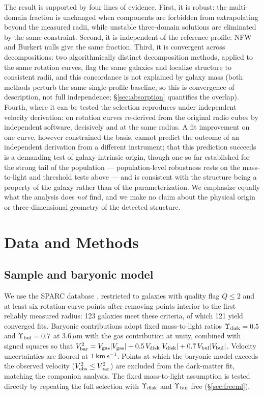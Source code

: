\documentclass[twocolumn]{aastex701}
\begin{document}
The result is supported by four lines of evidence. First, it is robust: the
multi-domain fraction is unchanged when components are forbidden from
extrapolating beyond the measured radii, while unstable three-domain
solutions are eliminated by the same constraint. Second, it is
independent of the reference profile: NFW and Burkert nulls give the same fraction. Third, it
is convergent across decompositions: two algorithmically distinct
decomposition methods, applied to the
same rotation curves, flag the same galaxies and localize structure to
consistent radii, and this concordance is not explained by galaxy mass
(both methods perturb the same single-profile baseline, so this is
convergence of description, not full independence; \S\ref{sec:absorption}
quantifies the overlap).
Fourth, where it can be tested the selection reproduces
under independent velocity derivation: on rotation curves re-derived from the
original radio cubes by independent software, decisively and at the same
radius. A fit improvement
on one curve, however constrained the basis, cannot predict the outcome of an
independent derivation from a different instrument; that this prediction
succeeds is a demanding test of galaxy-intrinsic origin, though one so far
established for the strong tail of the population --- population-level
robustness rests on the mass-to-light and threshold tests above --- and is
consistent with the structure being a property of the galaxy rather than of the
parameterization. We emphasize equally what
the analysis does \emph{not} find, and we make no claim about the physical
origin or three-dimensional geometry of the detected structure.

\section{Data and Methods} \label{sec:methods}

\subsection{Sample and baryonic model}

We use the SPARC database \citep{Lelli2016}, restricted to galaxies with
quality flag $Q \le 2$ and at least six rotation-curve points after removing
points interior to the first reliably measured radius: 123 galaxies meet
these criteria, of which 121 yield converged fits. Baryonic contributions
adopt fixed mass-to-light ratios $\Upsilon_{\rm disk} = 0.5$ and
$\Upsilon_{\rm bul} = 0.7$ at $3.6\,\mu$m with the gas contribution at unity,
combined with signed squares so that $V^2_{\rm bar} = V_{\rm gas}|V_{\rm
gas}| + 0.5\,V_{\rm disk}|V_{\rm disk}| + 0.7\,V_{\rm bul}|V_{\rm bul}|$.
Velocity uncertainties are floored at $1\,{\rm km\,s^{-1}}$. Points at which
the baryonic model exceeds the observed velocity ($V^2_{\rm obs} \le V^2_{\rm
bar}$) are excluded from the dark-matter fit, matching the companion analysis.
The fixed mass-to-light assumption is tested directly by repeating the full
selection with $\Upsilon_{\rm disk}$ and $\Upsilon_{\rm bul}$ free
(\S\ref{sec:freeml}).
\end{document}
